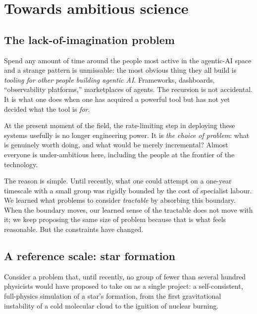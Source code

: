 
\section{Towards ambitious science}\label{sec:ambitious-science}

\subsection{The lack-of-imagination problem}

Spend any amount of time around the people most active in
the agentic-AI space and a strange pattern is unmissable: the
most obvious thing they all build is \emph{tooling for other
people building agentic AI}.  Frameworks, dashboards,
``observability platforms,'' marketplaces of agents.  The
recursion is not accidental.  It is what one does when one
has acquired a powerful tool but has not yet decided what
the tool is \emph{for}.

\begin{keyresult}
  At the present moment of the field, the rate-limiting step
  in deploying these systems usefully is no longer engineering
  power.  It is \emph{the choice of problem}: what is genuinely
  worth doing, and what would be merely incremental?  Almost
  everyone is under-ambitious here, including the people at
  the frontier of the technology.
\end{keyresult}

The reason is simple.  Until recently, what one could attempt
on a one-year timescale with a small group was rigidly
bounded by the cost of specialist labour.  We learned what
problems to consider \emph{tractable} by absorbing this
boundary.  When the boundary moves, our learned sense of the
tractable does not move with it; we keep proposing the same
size of problem because that is what feels reasonable.  But
the constraints have changed.

\subsection{A reference scale: star formation}

Consider a problem that, until recently, no group of fewer
than several hundred physicists would have proposed to take
on as a single project: a self-consistent, full-physics
simulation of a star's formation, from the first
gravitational instability of a cold molecular cloud to the
ignition of nuclear burning.


